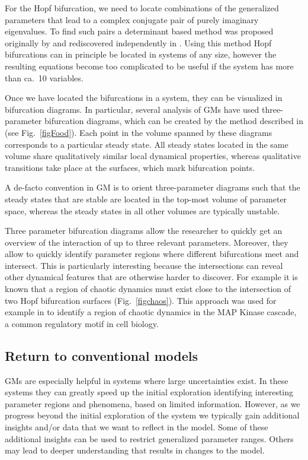 \documentclass{article}
\begin{document}
For the Hopf bifurcation, we need to locate combinations of the generalized parameters that lead to a complex conjugate pair of purely imaginary eigenvalues. To find such pairs a determinant based method was proposed originally by \cite{guckenheimer1997computing} and rediscovered independently in \cite{Gross2004PD}. Using this method Hopf bifurcations can in principle be located in systems of any size, however the resulting equations become too complicated to be useful if the system has more than ca.~10 variables. 

Once we have located the bifurcations in a system, they can be visualized in bifurcation diagrams. In particular, several analysis of GMs have used three-parameter bifurcation diagrams, which can be created by the method described in \cite{Stiefs2008IJBC} (see Fig.~\ref{figFood}). Each point in the volume spanned by these diagrams corresponds to a particular steady state. All steady states located in the same volume share qualitatively similar local dynamical properties, whereas qualitative transitions take place at the surfaces, which mark bifurcation points. 

A de-facto convention in GM is to orient three-parameter diagrams such that the steady states that are stable are located in the top-most volume of parameter space, whereas the steady states in all other volumes are typically unstable. 

Three parameter bifurcation diagrams allow the researcher to quickly get an overview of the interaction of up to three relevant parameters. Moreover, they allow to quickly identify parameter regions where different bifurcations meet and intersect. This is particularly interesting because the intersections can reveal other dynamical features that are otherwise harder to discover. For example it is known that a region of chaotic dynamics must exist close to the intersection of two Hopf bifurcation surfaces \citep{Kuznetsov} (Fig.~\ref{figchaos}). This approach was used for example in \cite{zumsande2011general} to identify a region of chaotic dynamics in the MAP Kinase cascade, a common regulatory motif in cell biology.  

\subsection{Return to conventional models}
GMs are especially helpful in systems where large uncertainties exist. In these systems they can greatly speed up the initial exploration identifying interesting parameter regions and phenomena, based on limited information. However, as we progress beyond the initial exploration of the system we typically gain additional insights and/or data that we want to reflect in the model. Some of these additional insights can be used to restrict generalized parameter ranges. Others may lead to deeper understanding that results in changes to the model. 
\end{document}
